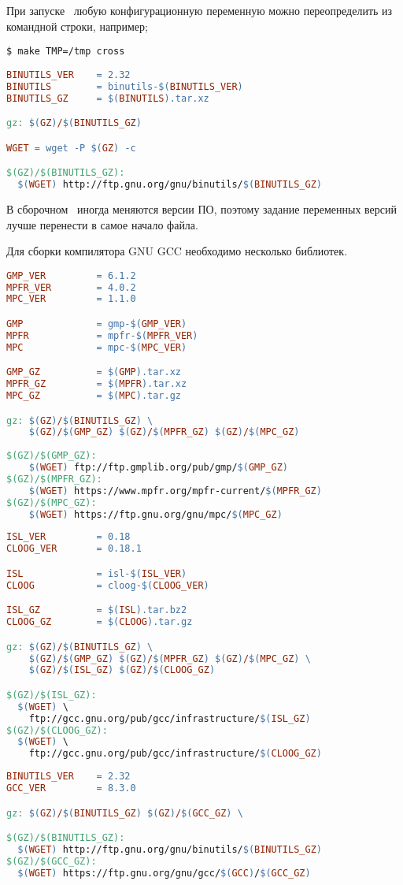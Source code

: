 При запуске \ любую конфигурационную переменную можно переопределить
из командной строки, например;
\begin{lstlisting}
$ make TMP=/tmp cross
\end{lstlisting}

\begin{lstlisting}[language=make]
BINUTILS_VER	= 2.32
BINUTILS		= binutils-$(BINUTILS_VER)
BINUTILS_GZ		= $(BINUTILS).tar.xz

gz: $(GZ)/$(BINUTILS_GZ)

WGET = wget -P $(GZ) -c

$(GZ)/$(BINUTILS_GZ):
  $(WGET) http://ftp.gnu.org/gnu/binutils/$(BINUTILS_GZ)
\end{lstlisting}

В сборочном \ иногда меняются версии ПО, поэтому задание
переменных версий лучше перенести в самое начало файла.

Для сборки компилятора GNU GCC необходимо несколько библиотек.
\begin{lstlisting}[language=make]
GMP_VER			= 6.1.2
MPFR_VER		= 4.0.2
MPC_VER			= 1.1.0

GMP				= gmp-$(GMP_VER)
MPFR			= mpfr-$(MPFR_VER)
MPC				= mpc-$(MPC_VER)

GMP_GZ			= $(GMP).tar.xz
MPFR_GZ			= $(MPFR).tar.xz
MPC_GZ			= $(MPC).tar.gz

gz: $(GZ)/$(BINUTILS_GZ) \
	$(GZ)/$(GMP_GZ) $(GZ)/$(MPFR_GZ) $(GZ)/$(MPC_GZ)
	
$(GZ)/$(GMP_GZ):
	$(WGET) ftp://ftp.gmplib.org/pub/gmp/$(GMP_GZ)
$(GZ)/$(MPFR_GZ):
	$(WGET) https://www.mpfr.org/mpfr-current/$(MPFR_GZ)
$(GZ)/$(MPC_GZ):
	$(WGET) https://ftp.gnu.org/gnu/mpc/$(MPC_GZ)
\end{lstlisting}

\begin{lstlisting}[language=make]
ISL_VER			= 0.18
CLOOG_VER		= 0.18.1

ISL				= isl-$(ISL_VER)
CLOOG			= cloog-$(CLOOG_VER)

ISL_GZ			= $(ISL).tar.bz2
CLOOG_GZ		= $(CLOOG).tar.gz

gz: $(GZ)/$(BINUTILS_GZ) \
	$(GZ)/$(GMP_GZ) $(GZ)/$(MPFR_GZ) $(GZ)/$(MPC_GZ) \
	$(GZ)/$(ISL_GZ) $(GZ)/$(CLOOG_GZ)

$(GZ)/$(ISL_GZ):
  $(WGET) \
    ftp://gcc.gnu.org/pub/gcc/infrastructure/$(ISL_GZ)
$(GZ)/$(CLOOG_GZ):
  $(WGET) \
    ftp://gcc.gnu.org/pub/gcc/infrastructure/$(CLOOG_GZ)
\end{lstlisting}

\clearpage
\begin{lstlisting}[language=make]
BINUTILS_VER	= 2.32
GCC_VER			= 8.3.0

gz: $(GZ)/$(BINUTILS_GZ) $(GZ)/$(GCC_GZ) \

$(GZ)/$(BINUTILS_GZ):
  $(WGET) http://ftp.gnu.org/gnu/binutils/$(BINUTILS_GZ)
$(GZ)/$(GCC_GZ):
  $(WGET) https://ftp.gnu.org/gnu/gcc/$(GCC)/$(GCC_GZ)
\end{lstlisting}
